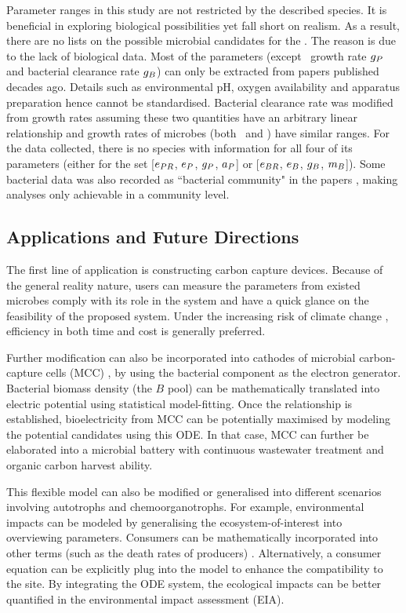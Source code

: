 \documentclass[../thesis.tex]{subfiles} %
\begin{document}
Parameter ranges in this study are not restricted by the described species.  It is beneficial in exploring biological possibilities yet fall short on realism.  As a result, there are no lists on the possible microbial candidates for the \pbs.  The reason is due to the lack of biological data.  Most of the parameters (except \phy\ growth rate $g_P$ and bacterial clearance rate $g_B$) can only be extracted from papers published decades ago.  Details such as environmental pH, oxygen availability and apparatus preparation hence cannot be standardised.  Bacterial clearance rate was modified from growth rates assuming these two quantities have an arbitrary linear relationship and growth rates of microbes (both \phy\ and \bac) have similar ranges.  For the data collected, there is no species with information for all four of its parameters (either for the set [$e_{PR}$, $e_P$, $g_P$, $a_P$] or [$e_{BR}$, $e_B$, $g_B$, $m_B$]).  Some bacterial data was also recorded as ``bacterial community" in the papers \autocite{cochran1988estimation}, making analyses only achievable in a community level.

\subsection{Applications and Future Directions}
The first line of application is constructing carbon capture devices.  Because of the general reality nature, users can measure the parameters from existed microbes comply with its role in the system and have a quick glance on the feasibility of the proposed system.  Under the increasing risk of climate change \autocite{notz2016observed,schuur2015climate}, efficiency in both time and cost is generally preferred.

Further modification can also be incorporated into cathodes of microbial carbon-capture cells (MCC) \autocite{varanasi2020improvement,mohamed2020bioelectricity,neethu2018enhancement,pandit2012microbial}, by using the bacterial component as the electron generator.  Bacterial biomass density (the $B$ pool) can be mathematically translated into electric potential using statistical model-fitting.  Once the relationship is established, bioelectricity from MCC can be potentially maximised by modeling the potential candidates using this ODE.  In that case, MCC can further be elaborated into a microbial battery with continuous wastewater treatment \autocite{mohamed2020bioelectricity} and organic carbon harvest ability.

This flexible model can also be modified or generalised into different scenarios involving autotrophs and chemoorganotrophs.  For example, environmental impacts can be modeled by generalising the ecosystem-of-interest into overviewing parameters.  Consumers can be mathematically incorporated into other terms (such as the death rates of producers) \autocite{hurtt1996pelagic}.  Alternatively, a consumer equation can be explicitly plug into the model to enhance the compatibility to the site.  By integrating the ODE system, the ecological impacts can be better quantified in the environmental impact assessment (EIA).
\end{document}
